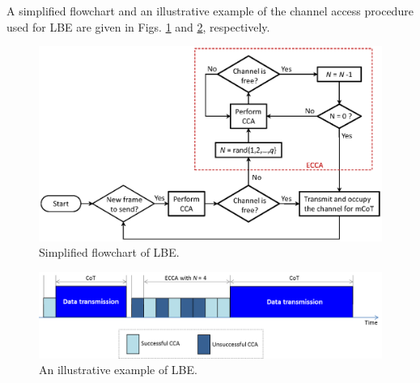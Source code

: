 A simplified flowchart and an illustrative example of the channel access procedure used for LBE are given in Figs. \ref{figs:LBE-flowchart} and \ref{figs:LBE-example}, respectively.
\begin{figure}[!ht]
	\centering
	\includegraphics[width=0.9\columnwidth]{figs/LBE-flowchart}
	\caption{Simplified flowchart of LBE.}
	\label{figs:LBE-flowchart}
\end{figure}
\begin{figure}[!ht]
	\centering
	\includegraphics[width=0.9\columnwidth]{figs/LBE-example}
	\caption{An illustrative example of LBE.}
	\label{figs:LBE-example}
\end{figure}

